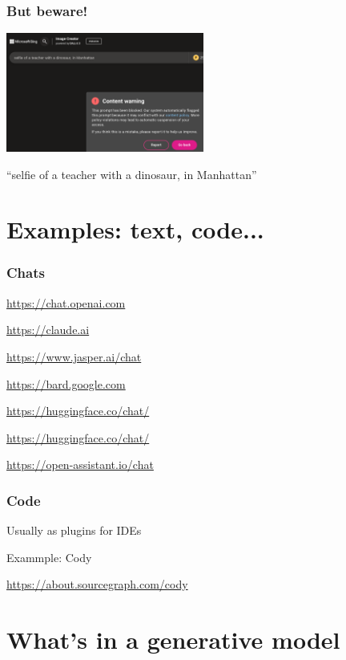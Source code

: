 \documentclass[17pt,aspectratio=169,hyperref={pdfusetitle,colorlinks,allcolors=olive}]{beamer}
\begin{document}
\begin{frame}[fragile]
  \frametitle{But beware!}

  \includegraphics[width=6.5cm]{figs/bing-content-warning}

  {\small
  ``selfie of a teacher with a dinosaur, in Manhattan''
}  
\end{frame}



\section{Examples: text, code...}

\begin{frame}[fragile]
\frametitle{Chats}

  \url{https://chat.openai.com}

\url{https://claude.ai}

\url{https://www.jasper.ai/chat}

\url{https://bard.google.com}

\url{https://huggingface.co/chat/}

\url{https://huggingface.co/chat/}

\url{https://open-assistant.io/chat}

\end{frame}

\begin{frame}[fragile]
\frametitle{Code}

Usually as plugins for IDEs

Exammple: Cody

\url{https://about.sourcegraph.com/cody}

\end{frame}


\section{What's in a generative model}
\end{document}
